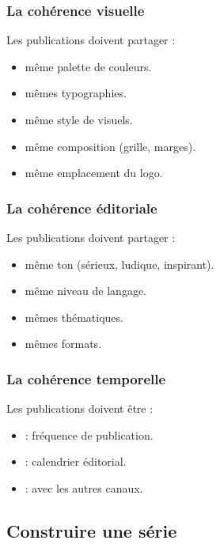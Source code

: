 \subsubsection{La cohérence visuelle}

Les publications doivent partager :

\begin{itemize}
    \item {} même palette de couleurs.
    \item {} mêmes typographies.
    \item {} même style de visuels.
    \item {} même composition (grille, marges).
    \item {} même emplacement du logo.
\end{itemize}

\subsubsection{La cohérence éditoriale}

Les publications doivent partager :

\begin{itemize}
    \item {} même ton (sérieux, ludique, inspirant).
    \item {} même niveau de langage.
    \item {} mêmes thématiques.
    \item {} mêmes formats.
\end{itemize}

\subsubsection{La cohérence temporelle}

Les publications doivent être :

\begin{itemize}
    \item {} : fréquence de publication.
    \item {} : calendrier éditorial.
    \item {} : avec les autres canaux.
\end{itemize}

\subsection{Construire une série}

